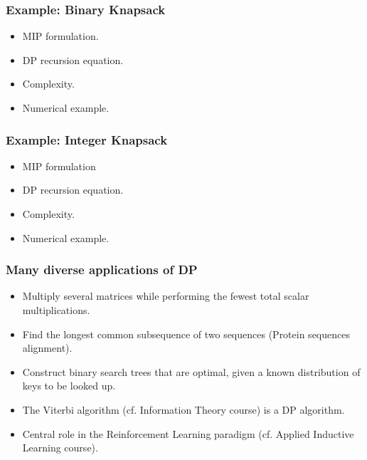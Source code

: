 \documentclass[10pt,handout]{beamer}
\begin{document}
\begin{frame}\frametitle{Example: Binary Knapsack}
\begin{itemize}
\item MIP formulation.
\item DP recursion equation.
\item Complexity.
\item Numerical example.
\end{itemize}
\end{frame}

\begin{frame}\frametitle{Example: Integer Knapsack}
\begin{itemize}
\item MIP formulation
\item DP recursion equation.
\item Complexity.
\item Numerical example.
\end{itemize}
\end{frame}



\begin{frame} \frametitle{Many diverse applications of DP}
  \begin{itemize}
  \item Multiply several matrices while performing the fewest total scalar multiplications.
  \item Find the longest common subsequence of two sequences (Protein
    sequences alignment).
  \item Construct binary search trees that are optimal, given a known distribution of keys to be looked up.
  \item The Viterbi algorithm (cf. Information Theory course) is a DP algorithm.
  \item Central role in the Reinforcement Learning paradigm (cf. Applied Inductive Learning course).
  \end{itemize}
\end{frame}
\end{document}
